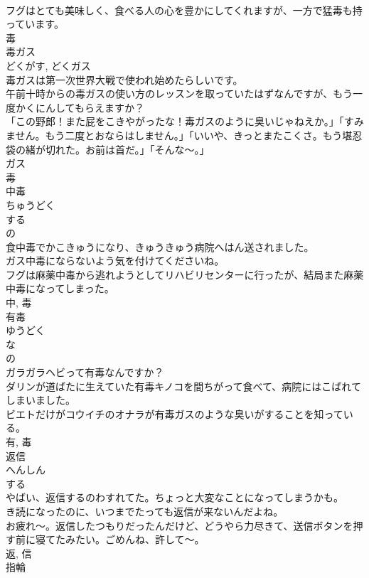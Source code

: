 \documentclass[8pt]{extreport}
\begin{document}
\begin{CJK}{UTF8}{min}
\\	フグはとても美味しく、食べる人の心を豊かにしてくれますが、一方で猛毒も持っています。	
\\	毒	
\\	毒ガス	
\\	どくがす, どくガス	
\\	毒ガスは第一次世界大戦で使われ始めたらしいです。	
\\	午前十時からの毒ガスの使い方のレッスンを取っていたはずなんですが、もう一度かくにんしてもらえますか？	
\\	「この野郎！また屁をこきやがったな！毒ガスのように臭いじゃねえか。」「すみません。もう二度とおならはしません。」「いいや、きっとまたこくさ。もう堪忍袋の緒が切れた。お前は首だ。」「そんな〜。」	
\\	ガス 
\\	毒	
\\	中毒	
\\	ちゅうどく	
\\	する 
\\	の 
\\	食中毒でかこきゅうになり、きゅうきゅう病院へはん送されました。	
\\	ガス中毒にならないよう気を付けてくださいね。	
\\	フグは麻薬中毒から逃れようとしてリハビリセンターに行ったが、結局また麻薬中毒になってしまった。	
\\	中, 毒	
\\	有毒	
\\	ゆうどく	
\\	な 
\\	の 
\\	ガラガラヘビって有毒なんですか？	
\\	ダリンが道ばたに生えていた有毒キノコを間ちがって食べて、病院にはこばれてしまいました。	
\\	ビエトだけがコウイチのオナラが有毒ガスのような臭いがすることを知っている。	
\\	有, 毒	
\\	返信	
\\	へんしん	
\\	する 
\\	やばい、返信するのわすれてた。ちょっと大変なことになってしまうかも。	
\\	き読になったのに、いつまでたっても返信が来ないんだよね。	
\\	お疲れ〜。返信したつもりだったんだけど、どうやら力尽きて、送信ボタンを押す前に寝てたみたい。ごめんね、許して〜。	
\\	返, 信	
\\	指輪	

\end{CJK}
\end{document}
